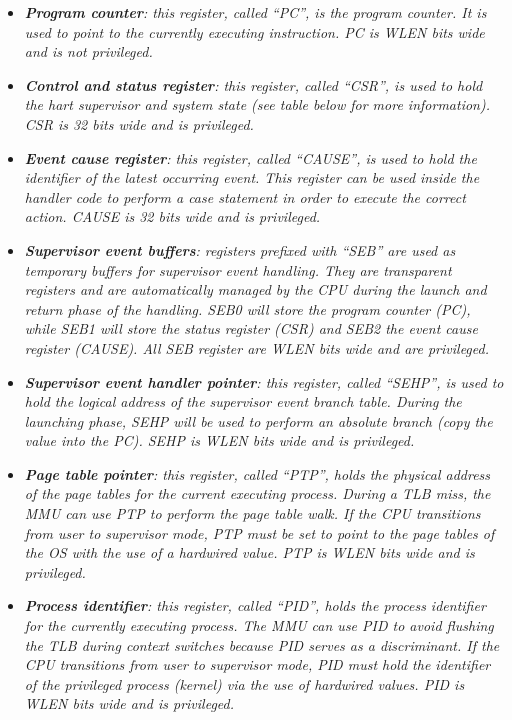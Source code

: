 \documentclass{article}
\begin{document}
\begin{itemize}
                    \item \textit{\textbf{Program counter}: this register, called ``PC'', is the program counter. It is used to point to the currently executing instruction. PC is WLEN bits wide and is not privileged.}

                    \item \textit{\textbf{Control and status register}: this register, called ``CSR'', is used to hold the hart supervisor and system state (see table below for more information). CSR is 32 bits wide and is privileged.}

                    \item \textit{\textbf{Event cause register}: this register, called ``CAUSE'', is used to hold the identifier of the latest occurring event. This register can be used inside the handler code to perform a case statement in order to execute the correct action. CAUSE is 32 bits wide and is privileged.}

                    \item \textit{\textbf{Supervisor event buffers}: registers prefixed with ``SEB'' are used as temporary buffers for supervisor event handling. They are transparent registers and are automatically managed by the CPU during the launch and return phase of the handling. SEB0 will store the program counter (PC), while SEB1 will store the status register (CSR) and SEB2 the event cause register (CAUSE). All SEB register are WLEN bits wide and are privileged.}

                    \item \textit{\textbf{Supervisor event handler pointer}: this register, called ``SEHP'', is used to hold the logical address of the supervisor event branch table. During the launching phase, SEHP will be used to perform an absolute branch (copy the value into the PC). SEHP is WLEN bits wide and is privileged.}

                    \item \textit{\textbf{Page table pointer}: this register, called ``PTP'', holds the physical address of the page tables for the current executing process. During a TLB miss, the MMU can use PTP to perform the page table walk. If the CPU transitions from user to supervisor mode, PTP must be set to point to the page tables of the OS with the use of a hardwired value. PTP is WLEN bits wide and is privileged.}

                    \item \textit{\textbf{Process identifier}: this register, called ``PID'', holds the process identifier for the currently executing process. The MMU can use PID to avoid flushing the TLB during context switches because PID serves as a discriminant. If the CPU transitions from user to supervisor mode, PID must hold the identifier of the privileged process (kernel) via the use of hardwired values. PID is WLEN bits wide and is privileged.}


\end{itemize}
\end{document}
